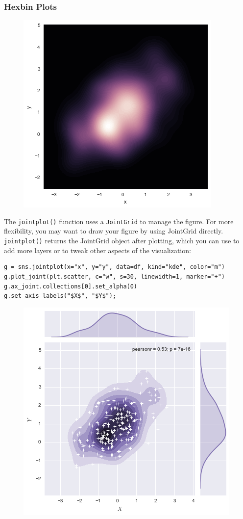\documentclass{beamer}
\begin{document}
\begin{frame}[fragile]
\frametitle{Hexbin Plots}
	\large
\begin{figure}
\centering
\includegraphics[width=0.7\linewidth]{images/distributions_38_0}
\caption{}
\label{fig:distributions_38_0}
\end{figure}


\end{frame}
\begin{frame}[fragile]
	\large
The \texttt{jointplot()} function uses a \texttt{JointGrid} to manage the figure. For more flexibility, you may want to draw your figure by using JointGrid directly. \texttt{jointplot()} returns the JointGrid object after plotting, which you can use to add more layers or to tweak other aspects of the visualization:
\begin{verbatim}
g = sns.jointplot(x="x", y="y", data=df, kind="kde", color="m")
g.plot_joint(plt.scatter, c="w", s=30, linewidth=1, marker="+")
g.ax_joint.collections[0].set_alpha(0)
g.set_axis_labels("$X$", "$Y$");
\end{verbatim}
\begin{figure}
\centering
\includegraphics[width=0.7\linewidth]{images/distributions_40_0}
\end{figure}


\end{frame}
\end{document}
